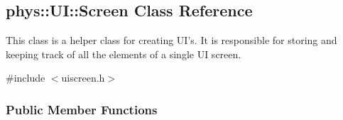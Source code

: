 \hypertarget{classphys_1_1UI_1_1Screen}{
\subsection{phys::UI::Screen Class Reference}
\label{d8/df0/classphys_1_1UI_1_1Screen}
}


This class is a helper class for creating UI's. It is responsible for storing and keeping track of all the elements of a single UI screen.  




{\ttfamily \#include $<$uiscreen.h$>$}

\subsubsection*{Public Member Functions}

